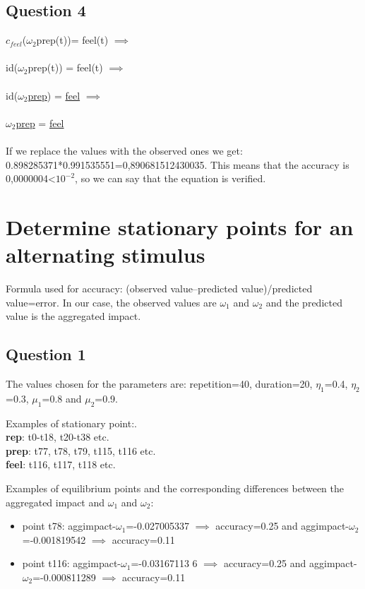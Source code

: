 \documentclass[a4paper]{article}
\begin{document}
\subsection{Question 4}


$c_{feel}$($\omega_{2}$prep(t))= feel(t) $\implies$ \\ \\
id($\omega_{2}$prep(t)) = feel(t) $\implies$ \\ \\
id($\omega_{2}$\underline{prep}) = \underline{feel} $\implies$\\ \\
$\omega_{2}$\underline{prep} = \underline{feel}\\ \\

If we replace the values with the observed ones we get: 0.898285371*0.991535551=0,890681512430035. This means that the accuracy is 0,0000004<$10^{-2}$, so we can say that the equation is verified.


\section{Determine stationary points for an alternating stimulus}

Formula used for accuracy: (observed value–predicted value)/predicted value=error. In our case, the observed values are $\omega_{1}$ and $\omega_{2}$ and the predicted value is the aggregated impact.

\subsection{Question 1}

The values chosen for the parameters are: repetition=40, duration=20, $\eta_{1}$=0.4, $\eta_{2}$=0.3, $\mu_{1}$=0.8 and $\mu_{2}$=0.9.

Examples of stationary point:. \\
\textbf{rep}: t0-t18, t20-t38 etc. \\
\textbf{prep}: t77, t78, t79, t115, t116 etc.	\\
\textbf{feel}: t116, t117, t118 etc.

Examples of equilibrium points and the corresponding differences between the aggregated impact and $\omega_{1}$ and $\omega_{2}$:
\begin{itemize}
\item point t78: aggimpact-$\omega_{1}$=-0.027005337 $\implies$ accuracy=0.25 and aggimpact-$\omega_{2}$=-0.001819542 $\implies$ accuracy=0.11 
\item point t116: aggimpact-$\omega_{1}$=-0.03167113 6 $\implies$ accuracy=0.25 and aggimpact-$\omega_{2}$=-0.000811289 $\implies$ accuracy=0.11
\end{itemize}
\end{document}
